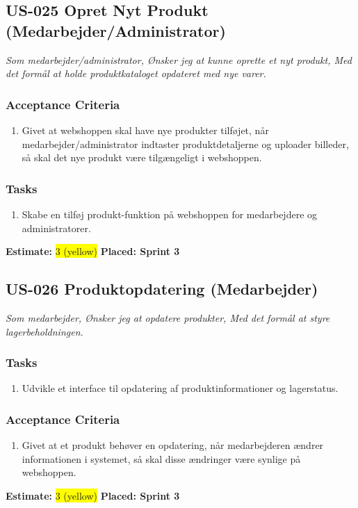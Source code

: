 \subsection{US-025 Opret Nyt Produkt (Medarbejder/Administrator)}
\label{sec:US-025}
\textit{Som medarbejder/administrator, Ønsker jeg at kunne oprette et nyt produkt, Med det formål at holde produktkataloget opdateret med nye varer.}
\subsubsection*{\textbf{Acceptance Criteria}}
\begin{enumerate}
  \item Givet at webshoppen skal have nye produkter tilføjet, når medarbejder/administrator indtaster produktdetaljerne og uploader billeder, så skal det nye produkt være tilgængeligt i webshoppen.
\end{enumerate}
\subsubsection*{\textbf{Tasks}}
\begin{enumerate}
  \item Skabe en tilføj produkt-funktion på webshoppen for medarbejdere og administratorer.
\end{enumerate}
\textbf{Estimate:} \colorbox{yellow}{3 (yellow)}
\textbf{Placed: Sprint 3}
\par\noindent\dotfill

\subsection{US-026 Produktopdatering (Medarbejder)}
\label{sec:US-026}
\textit{Som medarbejder, Ønsker jeg at opdatere produkter, Med det formål at styre lagerbeholdningen.}
\subsubsection*{\textbf{Tasks}}
\begin{enumerate}
  \item Udvikle et interface til opdatering af produktinformationer og lagerstatus.
\end{enumerate}
\subsubsection*{\textbf{Acceptance Criteria}}
\begin{enumerate}
  \item Givet at et produkt behøver en opdatering, når medarbejderen ændrer informationen i systemet, så skal disse ændringer være synlige på webshoppen.
\end{enumerate}
\textbf{Estimate:} \colorbox{yellow}{3 (yellow)}
\textbf{Placed: Sprint 3}
\par\noindent\dotfill

